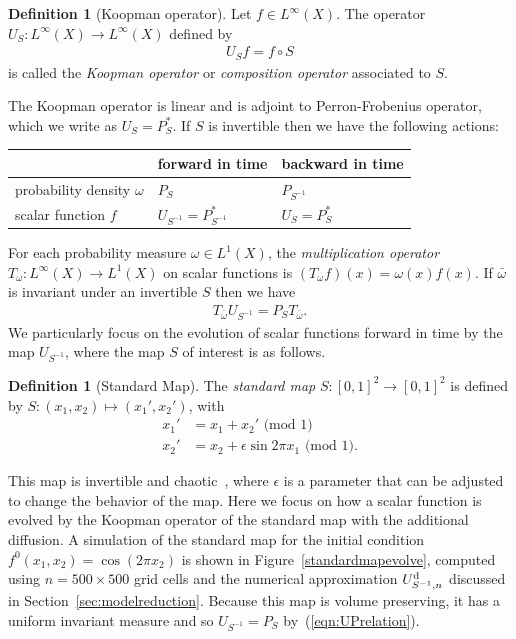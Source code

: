 \documentclass{aims}
\theoremstyle{definition}
\newtheorem{definition}[theorem]{Definition}
\begin{document}
\begin{definition}[Koopman operator]
Let $f \in L^\infty(X)$. The operator $U_S:L^{\infty}(X) \to
L^{\infty}(X)$ defined by
\begin{align}
 U_S f = f \circ S
\end{align}
is called the \emph{Koopman operator} or \emph{composition operator}
associated to $S$.
\end{definition}

The Koopman operator is linear and is adjoint to Perron-Frobenius
operator, which we write as $U_S = P_S^*$. If $S$ is invertible then
we have the following actions:
\begin{center}
\begin{tabular}{l|ll}
\label{PUtable}
& forward in time
& backward in time
\\
\hline
probability density $\omega$
& $P_S$
& $P_{S^{-1}}$
\\
scalar function $f$
& $ U_{S^{-1}} = P_{S^{-1}}^* $
& $ U_S  = P_S^*  $
\end{tabular}
\end{center}
For each probability measure $\omega \in L^1(X)$, the
\emph{multiplication operator} $T_{\omega} : L^\infty(X) \to
L^1(X)$ on scalar functions is $(T_{\omega}f)(x) = \omega(x)
f(x)$. If $\bar{\omega}$ is invariant under an invertible $S$ then we
have
\begin{align}
  \label{eqn:UPrelation}
  T_{\bar{\omega}} U_{S^{-1}} = P_S T_{\bar{\omega}}.
\end{align}
We particularly focus on the evolution of scalar functions
forward in time by the map $U_{S^{-1}}$, where the map $S$ of interest
is as follows.

\begin{definition}[Standard Map]
  The \emph{standard map} $S: [0,1]^2 \to [0,1]^2$
  is defined by $S: (x_1,x_2) \mapsto (x_1',x_2')$, with
  \begin{align}
    x_1' &= x_1+x_2' \text{ (mod 1)} \nonumber\\
    x_2' &=  x_2 +\epsilon \sin{2 \pi x_1}     \text{ (mod 1)}.
    \label{Standardmap}
  \end{align}
\end{definition}
This map is invertible and chaotic~\cite{Chirikov79, ChSh2008,
  Ott2002, LiLi1992}, where $\epsilon$ is a parameter that can be
adjusted to change the behavior of the map. Here we focus on how a
scalar function is evolved by the Koopman operator of the standard map
with the additional diffusion. A simulation of the standard map for
the initial condition $f^0(x_1,x_2)=\cos(2\pi x_2)$ is shown in
Figure~\ref{standardmapevolve}, computed using $n=500\times 500$ grid
cells and the numerical approximation $U_{S^{-1},n}^{\rm d}$ discussed
in Section~\ref{sec:modelreduction}. Because this map is volume
preserving, it has a uniform invariant measure and so $U_{S^{-1}}=P_S$
by~(\ref{eqn:UPrelation}).
\end{document}
